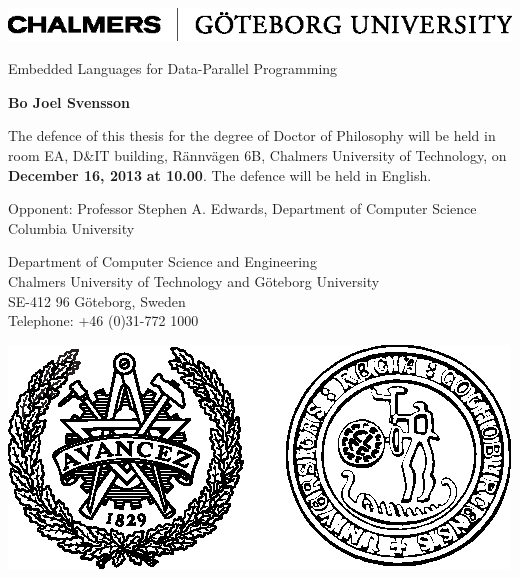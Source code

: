 \thispagestyle{empty}

\begin{center}

\includegraphics{ChalmGUtextsvEng.eps}

\vfill

{\huge Embedded Languages for Data-Parallel Programming}

\vfill

{\LARGE \bf Bo Joel Svensson}

\vfill
The defence of this thesis for the degree of Doctor of Philosophy\linebreak
will be held in room EA, D&IT building,\linebreak
R\"annv\"agen 6B, Chalmers University of Technology,\linebreak
on {\bf December 16, 2013} {\bf at 10.00}.
\linebreak\linebreak
The defence will be held in English.

\vfill

Opponent: Professor Stephen A. Edwards,\linebreak
Department of Computer Science\linebreak
Columbia University\linebreak


\vfill

Department of Computer Science and Engineering\\
Chalmers University of Technology and G\"oteborg University\\
SE-412 96 G\"oteborg, Sweden\\
Telephone: +46 (0)31-772 1000

\vfill

\includegraphics{ChalmGUmarke.eps}

\end{center}


\newpage
